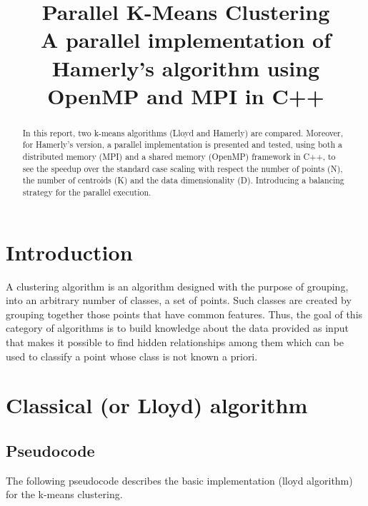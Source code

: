 \documentclass[conference]{IEEEtran}
\begin{document}
\title{Parallel K-Means Clustering\\
{\footnotesize A parallel implementation of Hamerly's algorithm using OpenMP and MPI in C++}
}

\author{
}

\maketitle

\begin{abstract}
In this report, two k-means algorithms (Lloyd and Hamerly) are compared. Moreover, for Hamerly's version, a parallel implementation is presented and tested, using both a distributed memory (MPI) and a shared memory (OpenMP) framework in C++, to see the speedup over the standard case scaling with respect the number of points (N), the number of centroids (K) and the data dimensionality (D). Introducing a balancing strategy for the parallel execution.
\end{abstract}

\section{Introduction}
A clustering algorithm is an algorithm designed with the purpose of grouping, into an arbitrary number of classes, a set of points. Such classes are created by grouping together those points that have common features. Thus, the goal of this category of algorithms is to build knowledge about the data provided as input that makes it possible to find hidden relationships among them which can be used to classify a point whose class is not known a priori.

\section{Classical (or Lloyd) algorithm}

\subsection{Pseudocode}
The following pseudocode describes the basic implementation (lloyd algorithm) for the k-means clustering.
\end{document}
